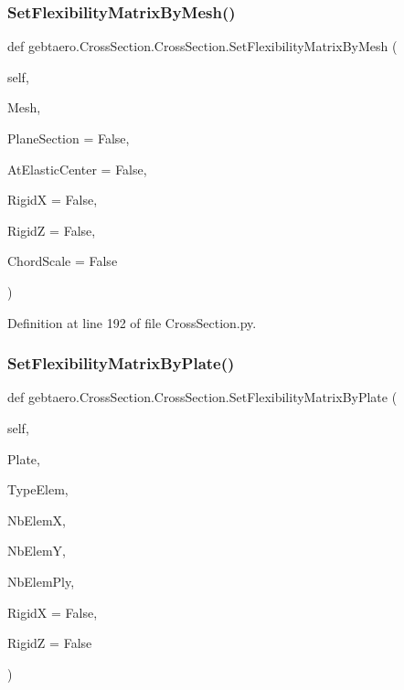 \subsubsection{\texorpdfstring{Set\+Flexibility\+Matrix\+By\+Mesh()}{SetFlexibilityMatrixByMesh()}}
{\footnotesize\ttfamily def gebtaero.\+Cross\+Section.\+Cross\+Section.\+Set\+Flexibility\+Matrix\+By\+Mesh (\begin{DoxyParamCaption}\item[{}]{self,  }\item[{}]{Mesh,  }\item[{}]{Plane\+Section = {\ttfamily False},  }\item[{}]{At\+Elastic\+Center = {\ttfamily False},  }\item[{}]{RigidX = {\ttfamily False},  }\item[{}]{RigidZ = {\ttfamily False},  }\item[{}]{Chord\+Scale = {\ttfamily False} }\end{DoxyParamCaption})}



Definition at line 192 of file Cross\+Section.\+py.

\mbox{\label{classgebtaero_1_1_cross_section_1_1_cross_section_a1f7fe7afe016bebd24eb42a7199df862}} 
\subsubsection{\texorpdfstring{Set\+Flexibility\+Matrix\+By\+Plate()}{SetFlexibilityMatrixByPlate()}}
{\footnotesize\ttfamily def gebtaero.\+Cross\+Section.\+Cross\+Section.\+Set\+Flexibility\+Matrix\+By\+Plate (\begin{DoxyParamCaption}\item[{}]{self,  }\item[{}]{Plate,  }\item[{}]{Type\+Elem,  }\item[{}]{Nb\+ElemX,  }\item[{}]{Nb\+ElemY,  }\item[{}]{Nb\+Elem\+Ply,  }\item[{}]{RigidX = {\ttfamily False},  }\item[{}]{RigidZ = {\ttfamily False} }\end{DoxyParamCaption})}

